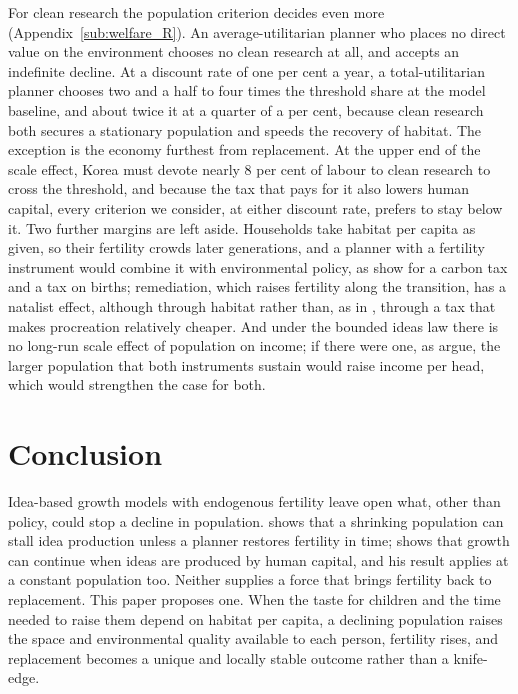 \documentclass[11pt]{article}
\begin{document}
For clean research the population criterion decides even more (Appendix~\ref{sub:welfare_R}). An
average-utilitarian planner who places no direct value on the environment chooses no clean research at
all, and accepts an indefinite decline. At a discount rate of one per cent a year, a total-utilitarian planner chooses two and a half to four
times the threshold share at the model baseline, and about twice it at a quarter of a per cent, because clean research both secures a stationary population and speeds the
recovery of habitat. The exception is the economy furthest from replacement. At the upper end of the
scale effect, Korea must devote nearly 8 per cent of labour to clean research to cross the threshold, and
because the tax that pays for it also lowers human capital, every criterion we consider, at either discount rate,
prefers to stay below it. Two further margins are left aside. Households take habitat per capita as given, so their fertility crowds
later generations, and a planner with a fertility instrument would combine it with environmental policy,
as \citet{gerlagh2023} show for a carbon tax and a tax on births; remediation, which raises
fertility along the transition, has a natalist effect, although through habitat rather than, as in
\citet{DELACROIX2012271}, through a tax that makes procreation relatively cheaper. And
under the bounded ideas law there is no long-run scale effect of population on income; if there were one,
as \citet{edenkuruc2026} argue, the larger population that both instruments sustain would raise income per
head, which would strengthen the case for both.

\section{Conclusion}
\label{sec:conclusion}

Idea-based growth models with endogenous fertility leave open what, other than policy, could stop a
decline in population. \citet{jones22} shows that a shrinking population can stall idea production
unless a planner restores fertility in time; \citet{STRULIK2024104943}
shows that growth can continue when ideas are produced by human capital, and his result applies at a
constant population too. Neither supplies a force that brings fertility back to replacement. This paper
proposes one. When the taste for children and the time needed to raise them depend on habitat per capita,
a declining population raises the space and environmental quality available to each person, fertility
rises, and replacement becomes a unique and locally stable outcome rather than a knife-edge.
\end{document}
